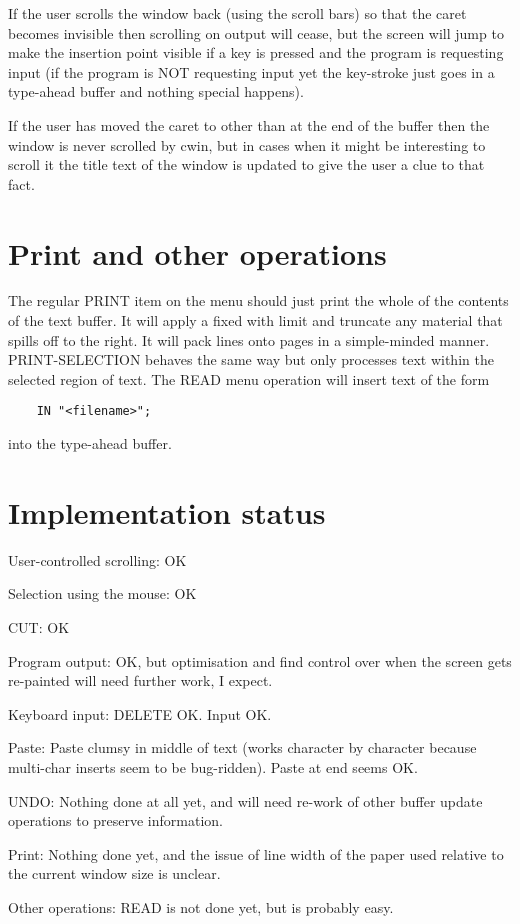 \documentclass[a4paper,11pt]{article}
\begin{document}
If the user scrolls the window back (using the scroll bars) so that the caret
becomes invisible then scrolling on output will cease, but the screen will
jump to make the insertion point visible if a key is pressed and the
program is requesting input (if the program is NOT requesting input yet the
key-stroke just goes in a type-ahead buffer and nothing special happens).

If the user has moved the caret to other than at the end of the buffer
then the window is never scrolled by cwin, but in cases when it might
be interesting to scroll it the title text of the window is updated to
give the user a clue to that fact.

\section{Print and other operations}
The regular PRINT item on the menu should just print the whole of the
contents of the text buffer. It will apply a fixed with limit and truncate
any material that spills off to the right. It will pack lines onto pages
in a simple-minded manner.  PRINT-SELECTION behaves the same way but
only processes text within the selected region of text.
The READ menu operation will insert text of the form
\begin{verbatim}
    IN "<filename>";
\end{verbatim}
into the type-ahead buffer.

\section{Implementation status}
\begin{description}
\item{User-controlled scrolling:} OK
\item{Selection using the mouse:} OK
\item{CUT:} OK
\item{Program output:} OK, but optimisation and find control over
when the screen gets re-painted will need further work, I expect.
\item{Keyboard input:} DELETE OK. Input OK.
\item{Paste:} Paste clumsy in middle of text (works character by character
because multi-char inserts seem to be bug-ridden). Paste at end seems
OK.
\item{UNDO:} Nothing done at all yet, and will need re-work of other buffer
update operations to preserve information.
\item{Print:} Nothing done yet, and the issue of line width of the paper used
relative to the current window size is unclear.
\item{Other operations:} READ is not done yet, but is probably easy.
\end{description}
\end{document}
